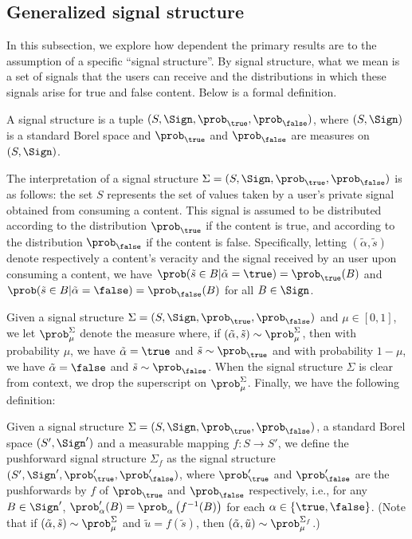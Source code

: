 \subsection{Generalized signal structure}\label{sub:signal_structure}
In this subsection, we explore how dependent the primary results are to the assumption of a specific ``signal structure''. By signal structure, what we mean is a set of signals that the users can receive and the distributions in which these signals arise for true and false content. Below is a formal definition. 
\begin{definition}
    A signal structure is a tuple $(S, \Sign,  \prob_\true, \prob_\false)$, where $(S, \Sign)$ is a standard Borel space and $\prob_\true$ and $\prob_\false$ are measures on $(S, \Sign)$.
\end{definition}
The interpretation of a signal structure $\Sigma = (S, \Sign, \prob_\true, \prob_\false)$ is as follows: the set $S$ represents the set of values taken by a user's private signal  obtained from consuming a content. This signal is assumed to be distributed according to the distribution $\prob_\true$ if the content is true, and according to the distribution $\prob_\false$ if the content is false. Specifically, letting $(\tilde{\alpha}, \tilde{s})$ denote respectively a content's veracity and the signal received by an user upon consuming a content, we have $\prob(\tilde{s} \in B | \tilde{\alpha} = \true) = \prob_\true(B)$ and $\prob(\tilde{s} \in B | \tilde{\alpha} = \false) = \prob_\false(B)$ for all $B \in \Sign$.

Given a signal structure $\Sigma = (S, \Sign, \prob_\true, \prob_\false)$ and $\mu \in [0,1]$, we let $\prob_{\mu}^{\Sigma}$ denote the measure where, if $(\tilde{\alpha}, \tilde{s}) \sim \prob_{\mu}^\Sigma$, then with probability $\mu$, we have $\tilde{\alpha} = \true$ and $\tilde{s} \sim \prob_\true$ and with probability $1 - \mu$, we have $\tilde{\alpha} = \false$ and $\tilde{s} \sim  \prob_{\false}$. When the signal structure $\Sigma$ is clear from context, we drop the superscript on $\prob_\mu^\Sigma$. Finally, we have the following definition:
\begin{definition} Given a signal structure $\Sigma = (S, \Sign, \prob_\true, \prob_\false)$, a standard Borel space $(S', \Sign')$ and a measurable mapping $f : S \to S'$, we define the pushforward signal structure $\Sigma_f$ as the signal structure $(S', \Sign', \prob_\true', \prob_\false')$, where $\prob_\true'$ and $\prob_\false'$ are the pushforwards by $f$ of   $\prob_\true$ and $\prob_\false$ respectively, i.e., for any $B \in \Sign'$, $\prob_\alpha'( B) = \prob_\alpha\left( f^{-1}(B)\right)$ for each $\alpha \in \{\true, \false\}$. (Note that if $(\tilde{\alpha}, \tilde{s}) \sim \prob_{\mu}^\Sigma$ and $\tilde{u} = f(\tilde{s})$, then $(\tilde{\alpha}, \tilde{u}) \sim \prob_\mu^{\Sigma_f}$.)  
\end{definition}

